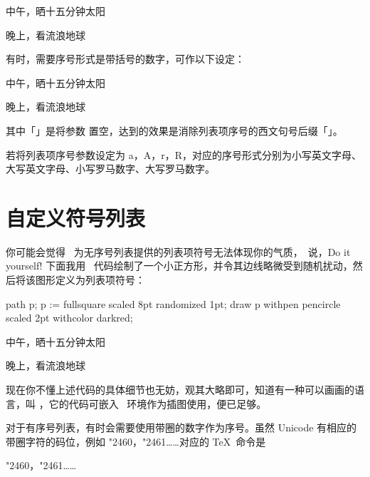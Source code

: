 \startsample
\startitemize[n]
\item 中午，晒十五分钟太阳
\item 晚上，看流浪地球 \Romannumerals[2]
\stopitemize
\stopsample
{}

有时，需要序号形式是带括号的数字，可作以下设定：

\startsample
\startitemize[n][left=(,right=),stopper=]
\item 中午，晒十五分钟太阳
\item 晚上，看流浪地球 \Romannumerals[2]
\stopitemize
\stopsample
{}

\noindent 其中「」是将参数  置空，达到的效果是消除列表项序号的西文句号后缀「」。

若将列表项序号参数设定为 a，A，r，R，对应的序号形式分别为小写英文字母、大写英文字母、小写罗马数字、大写罗马数字。

\section[item-sym-diy]{自定义符号列表}

你可能会觉得 \ConTeXt\ 为无序号列表提供的列表项符号无法体现你的气质，\ConTeXt\ 说，Do it yourself! 下面我用 \METAPOST\ 代码绘制了一个小正方形，并令其边线略微受到随机扰动，然后将该图形定义为列表项符号：

\startsample
{}
  path p;
  p := fullsquare scaled 8pt randomized 1pt;
  draw p withpen pencircle scaled 2pt
         withcolor darkred;
\stopuseMPgraphic

\startitemize[10]
\item 中午，晒十五分钟太阳
\item 晚上，看流浪地球 
\stopitemize
\stopsample
{}

\noindent 现在你不懂上述代码的具体细节也无妨，观其大略即可，知道有一种可以画画的语言，叫 \METAPOST，它的代码可嵌入 \ConTeXt\ 环境作为插图使用，便已足够。

对于有序号列表，有时会需要使用带圈的数字作为序号。虽然 Unicode 有相应的带圈字符的码位，例如 \char"2460，\char"2461……对应的 \TeX\ 命令是

\starttyping[option=TEX]
\char"2460，\char"2461……
\stoptyping

